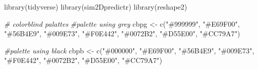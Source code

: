 \documentclass[
]{article}
\newenvironment{Shaded}{\begin{snugshade}}{\end{snugshade}}
\newcommand{\CommentTok}[1]{\textcolor[rgb]{0.56,0.35,0.01}{\textit{#1}}}
\newcommand{\FunctionTok}[1]{\textcolor[rgb]{0.00,0.00,0.00}{#1}}
\newcommand{\NormalTok}[1]{#1}
\newcommand{\OtherTok}[1]{\textcolor[rgb]{0.56,0.35,0.01}{#1}}
\newcommand{\StringTok}[1]{\textcolor[rgb]{0.31,0.60,0.02}{#1}}
\begin{document}
\begin{Shaded}
\begin{Highlighting}[]
\FunctionTok{library}\NormalTok{(tidyverse)}
\FunctionTok{library}\NormalTok{(sim2Dpredictr)}
\FunctionTok{library}\NormalTok{(reshape2)}

\CommentTok{\# colorblind palattes}
\CommentTok{\#palette using grey}
\NormalTok{cbpg }\OtherTok{\textless{}{-}} \FunctionTok{c}\NormalTok{(}\StringTok{"\#999999"}\NormalTok{, }\StringTok{"\#E69F00"}\NormalTok{, }\StringTok{"\#56B4E9"}\NormalTok{, }\StringTok{"\#009E73"}\NormalTok{,}
          \StringTok{"\#F0E442"}\NormalTok{, }\StringTok{"\#0072B2"}\NormalTok{, }\StringTok{"\#D55E00"}\NormalTok{, }\StringTok{"\#CC79A7"}\NormalTok{)}

\CommentTok{\#palette using black}
\NormalTok{cbpb }\OtherTok{\textless{}{-}} \FunctionTok{c}\NormalTok{(}\StringTok{"\#000000"}\NormalTok{, }\StringTok{"\#E69F00"}\NormalTok{, }\StringTok{"\#56B4E9"}\NormalTok{, }\StringTok{"\#009E73"}\NormalTok{,}
          \StringTok{"\#F0E442"}\NormalTok{, }\StringTok{"\#0072B2"}\NormalTok{, }\StringTok{"\#D55E00"}\NormalTok{, }\StringTok{"\#CC79A7"}\NormalTok{)}
\end{Highlighting}
\end{Shaded}
\end{document}
